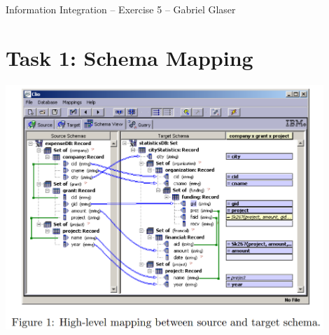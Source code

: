 \documentclass{scrartcl}
\begin{document}
	\begin{center}
		\LARGE
		Information Integration -- Exercise 5 -- Gabriel Glaser
	\end{center}
	
	\section*{Task 1: Schema Mapping}
	\begin{center}
		\includegraphics[width=0.9\textwidth]{figures/task1_image.PNG}
	\end{center}
	\begin{center}
	\end{center}
\end{document}
